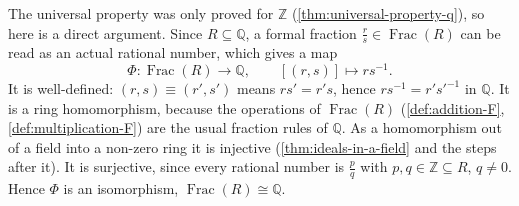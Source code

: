 \begin{content}
\begin{center}
\end{center}

\begin{steps}
The universal property was only proved for $\mathbb{Z}$ (\cref{thm:universal-property-q}), so here is a direct argument. Since $R \subseteq \mathbb{Q}$, a formal fraction $\frac{r}{s} \in \operatorname{Frac}(R)$ can be read as an actual rational number, which gives a map
\[
\Phi \colon \operatorname{Frac}(R) \to \mathbb{Q}, \qquad [(r, s)] \mapsto r s^{-1}.
\]
It is well-defined: $(r, s) \equiv (r', s')$ means $r s' = r' s$, hence $r s^{-1} = r' s'^{-1}$ in $\mathbb{Q}$. It is a ring homomorphism, because the operations of $\operatorname{Frac}(R)$ (\cref{def:addition-F}, \cref{def:multiplication-F}) are the usual fraction rules of $\mathbb{Q}$. As a homomorphism out of a field into a non-zero ring it is injective (\cref{thm:ideals-in-a-field} and the steps after it). It is surjective, since every rational number is $\frac{p}{q}$ with $p, q \in \mathbb{Z} \subseteq R$, $q \neq 0$. Hence $\Phi$ is an isomorphism, $\operatorname{Frac}(R) \cong \mathbb{Q}$.
\end{steps}
\end{content}

